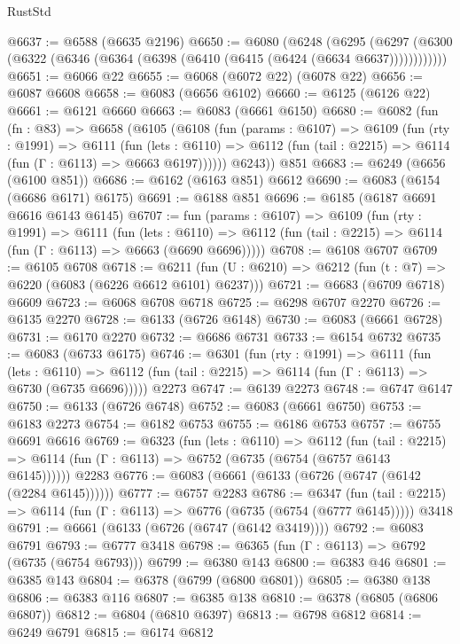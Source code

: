 \begin{lexlean}{RustStd}
\begin{coremodule}
@6637 := @6588 (@6635 @2196)
@6650 := @6080
    (@6248
      (@6295 (@6297 (@6300 (@6322 (@6346 (@6364 (@6398 (@6410 (@6415 (@6424 (@6634 @6637))))))))))))
@6651 := @6066 @22
@6655 := @6068 (@6072 @22) (@6078 @22)
@6656 := @6087 @6608
@6658 := @6083 (@6656 @6102)
@6660 := @6125 (@6126 @22)
@6661 := @6121 @6660
@6663 := @6083 (@6661 @6150)
@6680 := @6082
    (fun (fn : @83) =>
    @6658
      (@6105
        (@6108
          (fun (params : @6107) =>
          @6109
            (fun (rty : @1991) =>
            @6111
              (fun (lets : @6110) =>
              @6112 (fun (tail : @2215) => @6114 (fun (Γ : @6113) => @6663 @6197))))))
        @6243))
    @851
@6683 := @6249 (@6656 (@6100 @851))
@6686 := @6162 (@6163 @851) @6612
@6690 := @6083 (@6154 (@6686 @6171) @6175)
@6691 := @6188 @851
@6696 := @6185 (@6187 @6691 @6616 @6143 @6145)
@6707 := fun (params : @6107) =>
  @6109
    (fun (rty : @1991) =>
    @6111
      (fun (lets : @6110) =>
      @6112 (fun (tail : @2215) => @6114 (fun (Γ : @6113) => @6663 (@6690 @6696)))))
@6708 := @6108 @6707
@6709 := @6105 @6708
@6718 := @6211 (fun (U : @6210) => @6212 (fun (t : @7) => @6220 (@6083 (@6226 @6612 @6101) @6237)))
@6721 := @6683 (@6709 @6718) @6609
@6723 := @6068 @6708 @6718
@6725 := @6298 @6707 @2270
@6726 := @6135 @2270
@6728 := @6133 (@6726 @6148)
@6730 := @6083 (@6661 @6728)
@6731 := @6170 @2270
@6732 := @6686 @6731
@6733 := @6154 @6732
@6735 := @6083 (@6733 @6175)
@6746 := @6301
    (fun (rty : @1991) =>
    @6111
      (fun (lets : @6110) =>
      @6112 (fun (tail : @2215) => @6114 (fun (Γ : @6113) => @6730 (@6735 @6696)))))
    @2273
@6747 := @6139 @2273
@6748 := @6747 @6147
@6750 := @6133 (@6726 @6748)
@6752 := @6083 (@6661 @6750)
@6753 := @6183 @2273
@6754 := @6182 @6753
@6755 := @6186 @6753
@6757 := @6755 @6691 @6616
@6769 := @6323
    (fun (lets : @6110) =>
    @6112
      (fun (tail : @2215) => @6114 (fun (Γ : @6113) => @6752 (@6735 (@6754 (@6757 @6143 @6145))))))
    @2283
@6776 := @6083 (@6661 (@6133 (@6726 (@6747 (@6142 (@2284 @6145))))))
@6777 := @6757 @2283
@6786 := @6347
    (fun (tail : @2215) => @6114 (fun (Γ : @6113) => @6776 (@6735 (@6754 (@6777 @6145)))))
    @3418
@6791 := @6661 (@6133 (@6726 (@6747 (@6142 @3419))))
@6792 := @6083 @6791
@6793 := @6777 @3418
@6798 := @6365 (fun (Γ : @6113) => @6792 (@6735 (@6754 @6793)))
@6799 := @6380 @143
@6800 := @6383 @46
@6801 := @6385 @143
@6804 := @6378 (@6799 (@6800 @6801))
@6805 := @6380 @138
@6806 := @6383 @116
@6807 := @6385 @138
@6810 := @6378 (@6805 (@6806 @6807))
@6812 := @6804 (@6810 @6397)
@6813 := @6798 @6812
@6814 := @6249 @6791
@6815 := @6174 @6812

\end{coremodule}
\end{lexlean}
